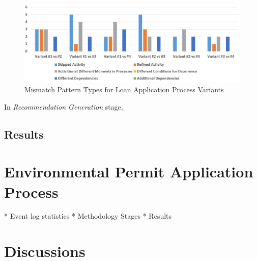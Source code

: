 \begin{figure}
	\centering
	\includegraphics[width=\textwidth]{5_results_discussions/loan-application-process/mismatch-pattern-types}
	\caption{Mismatch Pattern Types for Loan Application Process Variants}
  \label{fig:loan-mismatch-pattern-types}
\end{figure}
 
In \textit{Recommendation Generation} stage, 


\subsection{Results}
\label{sec:loan-app-results}

\section{Environmental Permit Application Process}
\label{sec:environmental-permit-application-process}
 
* Event log statistics
* Methodology Stages
* Results

\section{Discussions}
\label{sec:discussions}